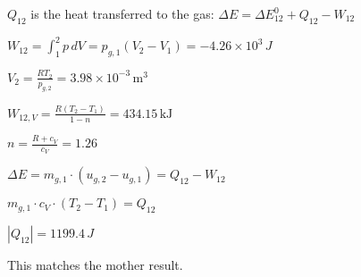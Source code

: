 \( Q_{12} \) is the heat transferred to the gas:  
\( \Delta E = \Delta E_{12}^{0} + Q_{12} - W_{12} \)  

\( W_{12} = \int_{1}^{2} p \, dV = p_{g,1} (V_{2} - V_{1}) = -4.26 \times 10^{3} \, J \)  

\( V_{2} = \frac{R T_{2}}{p_{g,2}} = 3.98 \times 10^{-3} \, \text{m}^3 \)  

\( W_{12,V} = \frac{R (T_{2} - T_{1})}{1 - n} = 434.15 \, \text{kJ} \)  

\( n = \frac{R + c_{V}}{c_{V}} = 1.26 \)  

\( \Delta E = m_{g,1} \cdot (u_{g,2} - u_{g,1}) = Q_{12} - W_{12} \)  

\( m_{g,1} \cdot c_{V} \cdot (T_{2} - T_{1}) = Q_{12} \)  

\( |Q_{12}| = 1199.4 \, J \)  

This matches the mother result.